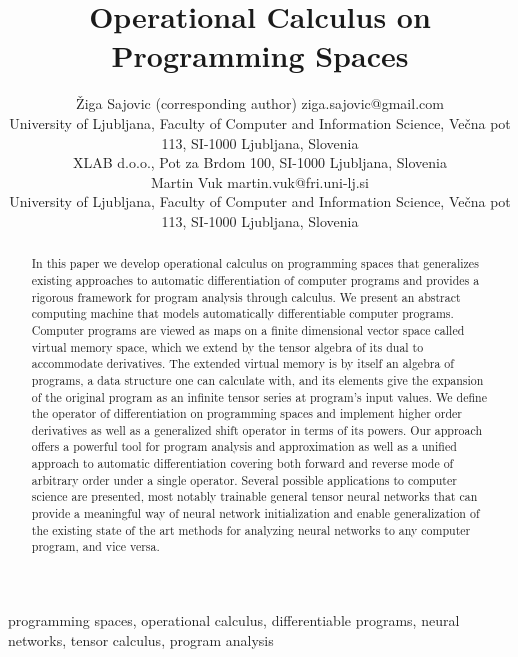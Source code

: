 \documentclass[11pt]{article}
\date{}
\begin{document}
\title{Operational Calculus on Programming Spaces}
\author{\name Žiga Sajovic (corresponding author) \email ziga.sajovic@gmail.com\\
  \addr University of Ljubljana, Faculty of Computer and Information
  Science,  Večna pot 113, SI-1000 Ljubljana, Slovenia\\
  XLAB d.o.o., Pot za Brdom 100, SI-1000 Ljubljana, Slovenia\\
  \AND
  Martin Vuk  \email martin.vuk@fri.uni-lj.si \\
    \addr  University of Ljubljana, Faculty of Computer and Information
  Science,  Večna pot 113, SI-1000 Ljubljana, Slovenia\\
}
\editor{}
\maketitle
\begin{abstract}%
In this paper we develop operational calculus on programming spaces that
generalizes existing approaches to automatic differentiation of computer
programs and provides a rigorous framework for program analysis through calculus. 
We present an abstract computing machine that models automatically
differentiable computer programs. Computer programs are viewed as maps on a
finite dimensional vector space called virtual memory space, which we
extend by the tensor algebra of its dual to accommodate derivatives. The
extended virtual memory is by itself an algebra of programs, a data structure one can calculate with, and its elements
give the expansion of the original program as an infinite tensor series at
program's input values.     
We define the operator of differentiation on programming spaces and
implement higher order derivatives as well as a generalized shift operator in
terms of its powers. Our approach offers a powerful tool for program
analysis and approximation as well as a unified approach to automatic
differentiation covering both forward and reverse mode of arbitrary order under a single operator. Several possible applications to computer science are
presented, most notably trainable general tensor neural networks that can
provide a meaningful way of neural network initialization and
enable generalization of the existing state of the art methods for analyzing neural
networks to any computer program, and vice versa. 


\end{abstract}
\begin{keywords}
  programming spaces,
  operational calculus,
  differentiable programs,
  neural networks,
  tensor calculus,
  program analysis
\end{keywords}
\end{document}
